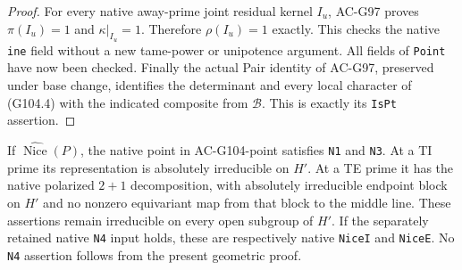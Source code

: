 \begin{proof}
For every native away-prime joint residual kernel \(I_u\),
AC-G97 proves \(\pi(I_u)=1\) and \(\kappa|_{I_u}=1\).
Therefore \(\rho(I_u)=1\) exactly.  This checks the native
\texttt{ine} field without a new tame-power or unipotence argument.
All fields of \texttt{Point} have now been checked.
Finally the actual Pair identity of AC-G97, preserved under
base change, identifies the determinant and every local character
of (G104.4) with the indicated composite from \(\mathscr B\).
This is exactly its \texttt{IsPt} assertion.
\end{proof}

\begin{theorem}
\label{AC-G104-nice}
If \(\widehat{\operatorname{Nice}}(P)\), the native point in
AC-G104-point satisfies \texttt{N1} and \texttt{N3}.
At a TI prime its representation is absolutely irreducible
on \(H'\).  At a TE prime it has the native polarized
\(2+1\) decomposition, with absolutely irreducible endpoint
block on \(H'\) and no nonzero equivariant map from that block
to the middle line.  These assertions remain irreducible on
every open subgroup of \(H'\).
If the separately retained native \texttt{N4} input holds,
these are respectively native \texttt{NiceI} and \texttt{NiceE}.
No \texttt{N4} assertion follows from the present geometric proof.
\end{theorem}

